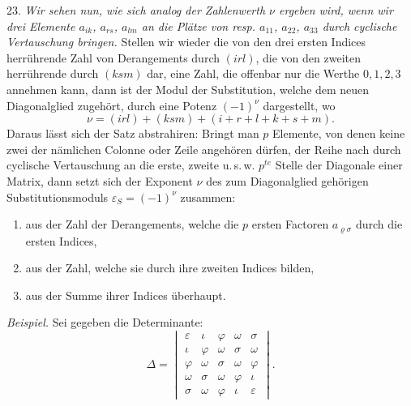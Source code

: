 23. \textit{Wir sehen nun, wie sich analog der Zahlenwerth $\nu$ ergeben wird,
wenn wir drei Elemente $a_{ik}$, $a_{rs}$, $a_{lm}$ an die Pl\"atze von resp.
$a_{11}$, $a_{22}$, $a_{33}$ durch cyclische Vertauschung bringen.} Stellen wir
wieder die von den drei ersten Indices herr\"uhrende Zahl von Derangements durch
$(irl)$, die von den zweiten herr\"uhrende durch $(ksm)$ dar, eine Zahl, die
offenbar nur die Werthe $0, 1, 2, 3$ annehmen kann, dann ist der Modul der
Substitution, welche dem neuen Diagonalglied zugeh\"ort, durch eine Potenz
$(-1)^{\nu}$ dargestellt, wo
\[
\nu = (irl) + (ksm) + (i + r + l + k + s + m).
\]
Daraus l\"asst sich der Satz abstrahiren: \glqq Bringt man $p$ Elemente, von
denen keine zwei der n\"amlichen Colonne oder Zeile angeh\"oren d\"urfen, der
Reihe nach durch cyclische Vertauschung an die erste, zweite u.\,s.\,w.
$p^{te}$ Stelle der Diagonale einer Matrix, dann setzt sich der Exponent $\nu$
des zum Diagonalglied geh\"origen Substitutionsmoduls $\varepsilon_S = (-1)^{\nu}$
zusammen:
\begin{enumerate}
\item[1)] aus der Zahl der Derangements, welche die $p$ ersten Factoren
$a_{\varrho\sigma}$ durch die ersten Indices,
\item[2)] aus der Zahl, welche sie durch ihre zweiten Indices bilden,
\item[3)] aus der Summe ihrer Indices \"uberhaupt.\grqq{}
\end{enumerate}
\textit{Beispiel.} Sei gegeben die Determinante:
\[
\Delta = \begin{vmatrix}
\varepsilon & \iota & \varphi & \omega & \sigma \\
\iota & \varphi & \omega & \sigma & \omega \\
\varphi & \omega & \sigma & \omega & \varphi \\
\omega & \sigma & \omega & \varphi & \iota \\
\sigma & \omega & \varphi & \iota & \varepsilon
\end{vmatrix}.
\]


